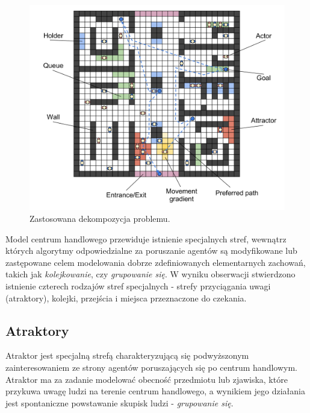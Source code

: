 \documentclass[a4paper, 12pt]{article}
\begin{document}
    \begin{figure}[H]
        \centering
        \includegraphics[scale=0.3]{./img/Overview.pdf}
        \caption{Zastosowana dekompozycja problemu.}
        \label{fig:overview}
    \end{figure}

Model centrum handlowego przewiduje istnienie specjalnych stref, wewnątrz których algorytmy odpowiedzialne za poruszanie agentów są modyfikowane lub zastępowane celem modelowania dobrze zdefiniowanych elementarnych zachowań, takich jak \emph{kolejkowanie}, czy \emph{grupowanie się}. W wyniku obserwacji stwierdzono istnienie czterech rodzajów stref specjalnych - strefy przyciągania uwagi (atraktory), kolejki, przejścia i miejsca przeznaczone do czekania. 

    \subsection{Atraktory}
    \label{sec:attractors}

Atraktor jest specjalną strefą charakteryzującą się podwyższonym zainteresowaniem ze strony agentów poruszających się po centrum handlowym. Atraktor ma za zadanie modelować obecność przedmiotu lub zjawiska, które przykuwa uwagę ludzi na terenie centrum handlowego, a wynikiem jego działania jest spontaniczne powstawanie skupisk ludzi - \emph{grupowanie się}.
\end{document}
